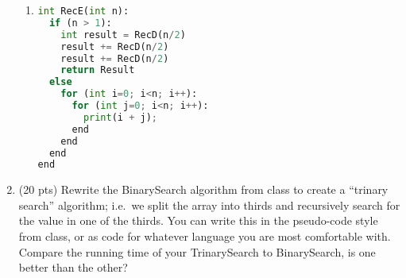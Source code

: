\documentclass[14pt]{extarticle}
\begin{document}
\begin{enumerate}
\begin{enumerate}
\item %
\begin{lstlisting}[language=Python]
int RecE(int n):
  if (n > 1):
    int result = RecD(n/2)
    result += RecD(n/2)
    result += RecD(n/2)
    return Result
  else
    for (int i=0; i<n; i++):
      for (int j=0; i<n; i++):
        print(i + j);
      end
    end
  end
end
\end{lstlisting}

\end{enumerate}


\pagebreak
\item (20 pts) Rewrite the BinarySearch algorithm from class to create a ``trinary search'' algorithm; i.e.~we split the array into thirds and recursively search for the value in one of the thirds. You can write this in the pseudo-code style from class, or as code for whatever language you are most comfortable with. Compare the running time of your TrinarySearch to BinarySearch, is one better than the other?






\end{enumerate}
\end{document}
